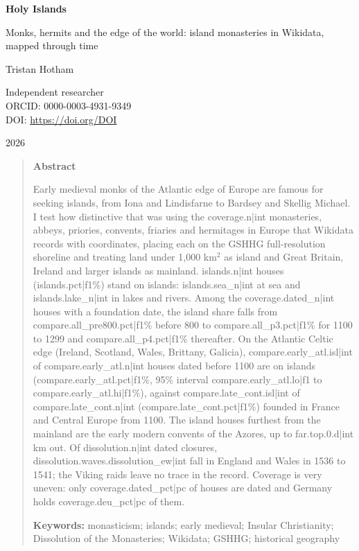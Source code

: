 \documentclass[11pt,a4paper]{article}
\begin{document}
\begin{center}
{\Large\bfseries Holy Islands\par}
\vspace{0.4em}
{\large Monks, hermits and the edge of the world: island monasteries in Wikidata, mapped through time\par}
\vspace{1.2em}
{\large Tristan Hotham\par}
\vspace{0.3em}
{\small Independent researcher\\
ORCID: 0000-0003-4931-9349\\
DOI: \href{https://doi.org/{{DOI}}}{https://doi.org/{{DOI}}}\par}
\vspace{0.8em}
2026
\end{center}

\begin{quote}
\small
\begin{center}\textbf{Abstract}\end{center}
Early medieval monks of the Atlantic edge of Europe are famous for seeking islands, from Iona and Lindisfarne to Bardsey and Skellig Michael. I test how distinctive that was using the {{coverage.n|int}} monasteries, abbeys, priories, convents, friaries and hermitages in Europe that Wikidata records with coordinates, placing each on the GSHHG full-resolution shoreline and treating land under 1,000 km$^2$ as island and Great Britain, Ireland and larger islands as mainland. {{islands.n|int}} houses ({{islands.pct|f1}}\%) stand on islands: {{islands.sea_n|int}} at sea and {{islands.lake_n|int}} in lakes and rivers. Among the {{coverage.dated_n|int}} houses with a foundation date, the island share falls from {{compare.all_pre800.pct|f1}}\% before 800 to {{compare.all_p3.pct|f1}}\% for 1100 to 1299 and {{compare.all_p4.pct|f1}}\% thereafter. On the Atlantic Celtic edge (Ireland, Scotland, Wales, Brittany, Galicia), {{compare.early_atl.isl|int}} of {{compare.early_atl.n|int}} houses dated before 1100 are on islands ({{compare.early_atl.pct|f1}}\%, 95\% interval {{compare.early_atl.lo|f1}} to {{compare.early_atl.hi|f1}}\%), against {{compare.late_cont.isl|int}} of {{compare.late_cont.n|int}} ({{compare.late_cont.pct|f1}}\%) founded in France and Central Europe from 1100. The island houses furthest from the mainland are the early modern convents of the Azores, up to {{far.top.0.d|int}} km out. Of {{dissolution.n|int}} dated closures, {{dissolution.waves.dissolution_ew|int}} fall in England and Wales in 1536 to 1541; the Viking raids leave no trace in the record. Coverage is very uneven: only {{coverage.dated_pct|pc}} of houses are dated and Germany holds {{coverage.deu_pct|pc}} of them.

\textbf{Keywords:} monasticism; islands; early medieval; Insular Christianity; Dissolution of the Monasteries; Wikidata; GSHHG; historical geography
\end{quote}
\end{document}
